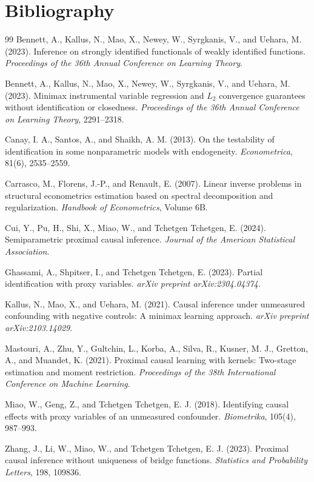 \documentclass[11pt]{article}
\theoremstyle{definition}
\theoremstyle{plain}
\theoremstyle{remark}
\begin{document}
\section*{Bibliography}
\begin{thebibliography}{99}
Bennett, A., Kallus, N., Mao, X., Newey, W., Syrgkanis, V., and Uehara, M. (2023).
Inference on strongly identified functionals of weakly identified functions.
\emph{Proceedings of the 36th Annual Conference on Learning Theory}.

Bennett, A., Kallus, N., Mao, X., Newey, W., Syrgkanis, V., and Uehara, M. (2023).
Minimax instrumental variable regression and \(L_2\) convergence guarantees without identification or closedness.
\emph{Proceedings of the 36th Annual Conference on Learning Theory}, 2291--2318.

Canay, I. A., Santos, A., and Shaikh, A. M. (2013).
On the testability of identification in some nonparametric models with endogeneity.
\emph{Econometrica}, 81(6), 2535--2559.

Carrasco, M., Florens, J.-P., and Renault, E. (2007).
Linear inverse problems in structural econometrics estimation based on spectral decomposition and regularization.
\emph{Handbook of Econometrics}, Volume 6B.

Cui, Y., Pu, H., Shi, X., Miao, W., and Tchetgen Tchetgen, E. (2024).
Semiparametric proximal causal inference.
\emph{Journal of the American Statistical Association}.

Ghassami, A., Shpitser, I., and Tchetgen Tchetgen, E. (2023).
Partial identification with proxy variables.
\emph{arXiv preprint arXiv:2304.04374}.

Kallus, N., Mao, X., and Uehara, M. (2021).
Causal inference under unmeasured confounding with negative controls: A minimax learning approach.
\emph{arXiv preprint arXiv:2103.14029}.

Mastouri, A., Zhu, Y., Gultchin, L., Korba, A., Silva, R., Kusner, M. J., Gretton, A., and Muandet, K. (2021).
Proximal causal learning with kernels: Two-stage estimation and moment restriction.
\emph{Proceedings of the 38th International Conference on Machine Learning}.

Miao, W., Geng, Z., and Tchetgen Tchetgen, E. J. (2018).
Identifying causal effects with proxy variables of an unmeasured confounder.
\emph{Biometrika}, 105(4), 987--993.

Zhang, J., Li, W., Miao, W., and Tchetgen Tchetgen, E. J. (2023).
Proximal causal inference without uniqueness of bridge functions.
\emph{Statistics and Probability Letters}, 198, 109836.
\end{thebibliography}
\end{document}
